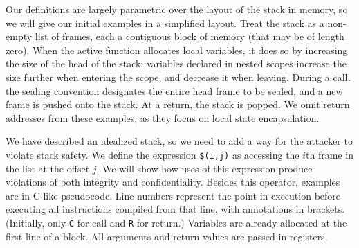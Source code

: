 \documentclass[acmsmall,review,anonymous]{acmart}\settopmatter{printfolios=true,printccs=false,printacmref=false}
\begin{document}
Our definitions are largely parametric over the layout of the stack in memory, so we
will give our initial examples in a simplified layout. Treat the stack as a non-empty
list of frames, each a contiguous block of memory (that may be of length zero). When
the active function allocates local variables, it does so by increasing the size of the
head of the stack; variables declared in nested scopes increase the size further when
entering the scope, and decrease it when leaving. During a call, the sealing convention
designates the entire head frame to be sealed, and a new frame is pushed onto the stack.
At a return, the stack is popped. We omit return addresses from these examples, as they
focus on local state encapsulation.

We have described an idealized stack, so we need to add a way for the attacker to violate
stack safety. We define the expression {\tt \$(i,j)} as accessing the \(i\)th frame in the
list at the offset \(j\). We will show how uses of this expression produce violations
of both integrity and confidentiality. Besides this operator, examples are in C-like
pseudocode. Line numbers represent the point in execution before executing all instructions
compiled from that line, with annotations in brackets. (Initially, only {\tt C} for call
and {\tt R} for return.) Variables are already allocated at the first line of a block.
All arguments and return values are passed in registers.


\end{document}
